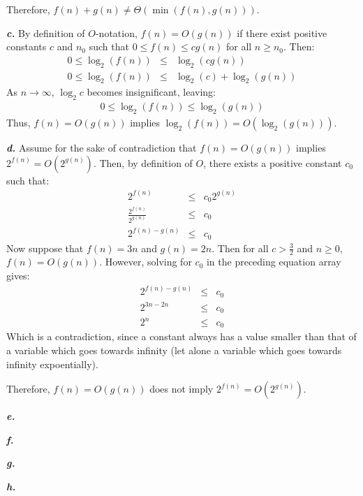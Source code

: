 \documentclass{article}
\begin{document}
Therefore, $f(n) + g(n) \neq \Theta(\min(f(n),g(n)))$.

\noindent\textbf{\textit{c.}} By definition of $O$-notation,  $f(n) = O(g(n))$ if there exist positive constants $c$ and $n_0$ such that $0 \leq f(n) \leq c g(n)$ for all $n \geq n_0$. Then:
\begin{eqnarray*}
	0 \leq \log_2(f(n)) & \leq & \log_2(c g(n)) \\
	0 \leq \log_2(f(n)) & \leq & \log_2(c) + \log_2(g(n))
\end{eqnarray*}
As $n \rightarrow \infty$, $\log_2 c$ becomes insignificant, leaving:
\begin{eqnarray*}
	0 \leq \log_2(f(n)) \leq \log_2(g(n))
\end{eqnarray*}
Thus, $f(n) = O(g(n))$ implies $\log_2(f(n)) = O(\log_2(g(n)))$.

\noindent\textbf{\textit{d.}} Assume for the sake of contradiction that $f(n) = O(g(n))$ implies $ 2^{f(n)} = O(2^{g(n)})$. Then, by definition of $O$, there exists a positive constant $c_0$ such that:
\begin{eqnarray*}
	2^{f(n)} & \leq & c_0 2^{g(n)} \\
	\frac{2^{f(n)}}{2^{g(n)}} & \leq & c_0 \\
	2^{f(n) - g(n)} & \leq & c_0
\end{eqnarray*}
Now suppose that $f(n) = 3n$ and $g(n) = 2n$. Then for all $c > \frac{3}{2}$ and $n \geq 0$, $f(n) = O(g(n))$. However, solving for $c_0$ in the preceding equation array gives:
\begin{eqnarray*}
	2^{f(n) - g(n)} & \leq & c_0 \\
	2^{3n - 2n} & \leq & c_0 \\
	2^n & \leq & c_0
\end{eqnarray*}
Which is a contradiction, since a constant always has a value smaller than that of a variable which goes towards infinity (let alone a variable which goes towards infinity expoentially).

Therefore, $f(n) = O(g(n))$ does not imply $2^{f(n)} = O(2^{g(n)})$.

\noindent\textbf{\textit{e.}}

\noindent\textbf{\textit{f.}}

\noindent\textbf{\textit{g.}}

\noindent\textbf{\textit{h.}}
\end{document}
